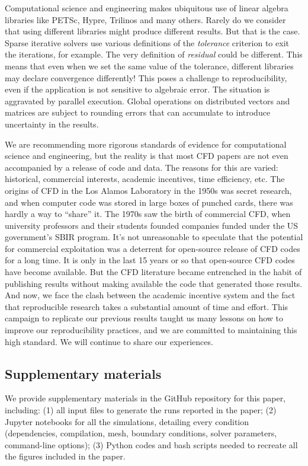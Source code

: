 \documentclass[9pt,twocolumn,twoside]{article}
\newlength{\up}
\begin{document}
Computational science and engineering makes ubiquitous use of linear algebra libraries like PETSc, Hypre, Trilinos and many others. 
Rarely do we consider that using different libraries might produce different results. 
But that is the case. 
Sparse iterative solvers use various definitions of the \textit{tolerance} criterion to exit the iterations, for example. 
The very definition of \textit{residual} could be different. 
This means that even when we set the same value of the tolerance, different libraries may declare convergence differently! 
This poses a challenge to reproducibility, even if the application is not sensitive to algebraic error. 
The situation is aggravated by parallel execution. 
Global operations on distributed vectors and matrices are subject to rounding errors that can accumulate to introduce uncertainty in the results. 

We are recommending more rigorous standards of evidence for computational science and engineering, but the reality is that most CFD papers are not even accompanied by a release of code and data. 
The reasons for this are varied: historical, commercial interests, academic incentives, time efficiency, etc. 
The origins of CFD in the Los Alamos Laboratory in the 1950s was secret research, and when computer code was stored in large boxes of punched cards, there was hardly a way to ``share'' it. 
The 1970s saw the birth of commercial CFD, when university professors and their students founded companies funded under the US government's SBIR program. 
It's not unreasonable to speculate that the potential for commercial exploitation was a deterrent for open-source release of CFD codes for a long time. 
It is only in the last 15 years or so that open-source CFD codes have become available. 
But the CFD literature became entrenched in the habit of publishing results without making available the code that generated those results. 
And now, we face the clash between the academic incentive system and the fact that reproducible research takes a substantial amount of time and effort. 
This campaign to replicate our previous results taught us many lessons on how to improve our reproducibility practices, and we are committed to maintaining this high standard. 
We will continue to share our experiences.



 \subsection*{Supplementary materials}
We provide supplementary materials in the GitHub repository for this paper, including: (1) all input files to generate the runs reported in the paper; (2) Jupyter notebooks for all the simulations, detailing every condition (dependencies, compilation, mesh, boundary conditions, solver parameters, command-line options); (3) Python codes and bash scripts needed to recreate all the figures included in the paper.
\end{document}
